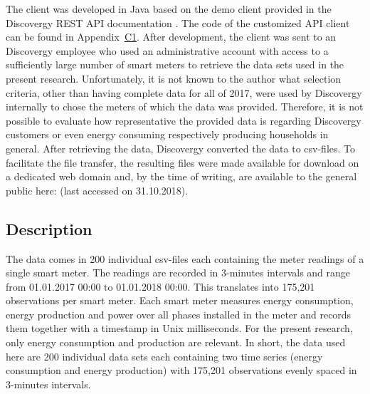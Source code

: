 The client was developed in Java based on the demo client provided in the Discovergy REST API documentation \citep{DiscovergyAPI:2018}. The code of the customized API client can be found in Appendix~\hyperlink{AppC1:Code:API}{C1}. After development, the client was sent to an Discovergy employee who used an administrative account with access to a sufficiently large number of smart meters to retrieve the data sets used in the present research. Unfortunately, it is not known to the author what selection criteria, other than having complete data for all of 2017, were used by Discovergy internally to chose the meters of which the data was provided. Therefore, it is not possible to evaluate how representative the provided data is regarding Discovergy customers or even energy consuming respectively producing households in general. After retrieving the data, Discovergy converted the data to csv-files. To facilitate the file transfer, the resulting files were made available for download on a dedicated web domain and, by the time of writing, are available to the general public here:  (last accessed on 31.10.2018). 




\subsection{Description}\label{Sec:Data;Subsec:Description}

The data comes in 200 individual csv-files each containing the meter readings of a single smart meter. The readings are recorded in 3-minutes intervals and range from 01.01.2017 00:00 to 01.01.2018 00:00. This translates into 175,201 observations per smart meter. Each smart meter measures energy consumption, energy production and power over all phases installed in the meter and records them together with a timestamp in Unix milliseconds. For the present research, only energy consumption and production are relevant. In short, the data used here are 200 individual data sets each containing two time series (energy consumption and energy production) with 175,201 observations evenly spaced in 3-minutes intervals.

